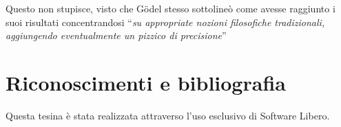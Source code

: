 \documentclass[a4paper,10pt]{article}
\begin{document}
Questo non stupisce, visto che Gödel stesso sottolineò come avesse raggiunto i suoi risultati concentrandosi \textquotedblleft\textit{su appropriate nozioni filosofiche tradizionali, aggiungendo eventualmente un pizzico di precisione}\textquotedblright \cite{odifreddi-e-ia}


\cleardoublepage

\section{Riconoscimenti e bibliografia}
Questa tesina è stata realizzata attraverso l'uso esclusivo di Software Libero.

\nocite{geb}




\listoffigures
\end{document}
